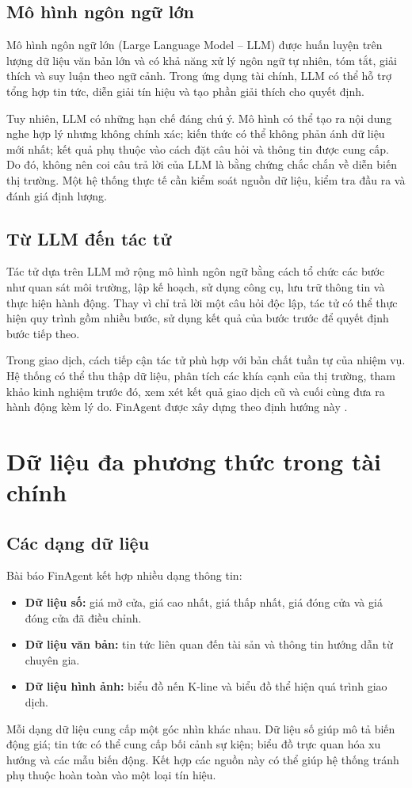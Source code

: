 \subsection{Mô hình ngôn ngữ lớn}
Mô hình ngôn ngữ lớn (Large Language Model -- LLM) được huấn luyện trên lượng dữ liệu văn bản lớn và có khả năng xử lý ngôn ngữ tự nhiên, tóm tắt, giải thích và suy luận theo ngữ cảnh. Trong ứng dụng tài chính, LLM có thể hỗ trợ tổng hợp tin tức, diễn giải tín hiệu và tạo phần giải thích cho quyết định.

Tuy nhiên, LLM có những hạn chế đáng chú ý. Mô hình có thể tạo ra nội dung nghe hợp lý nhưng không chính xác; kiến thức có thể không phản ánh dữ liệu mới nhất; kết quả phụ thuộc vào cách đặt câu hỏi và thông tin được cung cấp. Do đó, không nên coi câu trả lời của LLM là bằng chứng chắc chắn về diễn biến thị trường. Một hệ thống thực tế cần kiểm soát nguồn dữ liệu, kiểm tra đầu ra và đánh giá định lượng.

\subsection{Từ LLM đến tác tử}
Tác tử dựa trên LLM mở rộng mô hình ngôn ngữ bằng cách tổ chức các bước như quan sát môi trường, lập kế hoạch, sử dụng công cụ, lưu trữ thông tin và thực hiện hành động. Thay vì chỉ trả lời một câu hỏi độc lập, tác tử có thể thực hiện quy trình gồm nhiều bước, sử dụng kết quả của bước trước để quyết định bước tiếp theo.

Trong giao dịch, cách tiếp cận tác tử phù hợp với bản chất tuần tự của nhiệm vụ. Hệ thống có thể thu thập dữ liệu, phân tích các khía cạnh của thị trường, tham khảo kinh nghiệm trước đó, xem xét kết quả giao dịch cũ và cuối cùng đưa ra hành động kèm lý do. FinAgent được xây dựng theo định hướng này \cite{zhang2024finagent}.

\section{Dữ liệu đa phương thức trong tài chính}

\subsection{Các dạng dữ liệu}
Bài báo FinAgent kết hợp nhiều dạng thông tin:
\begin{itemize}
    \item \textbf{Dữ liệu số:} giá mở cửa, giá cao nhất, giá thấp nhất, giá đóng cửa và giá đóng cửa đã điều chỉnh.
    \item \textbf{Dữ liệu văn bản:} tin tức liên quan đến tài sản và thông tin hướng dẫn từ chuyên gia.
    \item \textbf{Dữ liệu hình ảnh:} biểu đồ nến K-line và biểu đồ thể hiện quá trình giao dịch.
\end{itemize}
Mỗi dạng dữ liệu cung cấp một góc nhìn khác nhau. Dữ liệu số giúp mô tả biến động giá; tin tức có thể cung cấp bối cảnh sự kiện; biểu đồ trực quan hóa xu hướng và các mẫu biến động. Kết hợp các nguồn này có thể giúp hệ thống tránh phụ thuộc hoàn toàn vào một loại tín hiệu.

